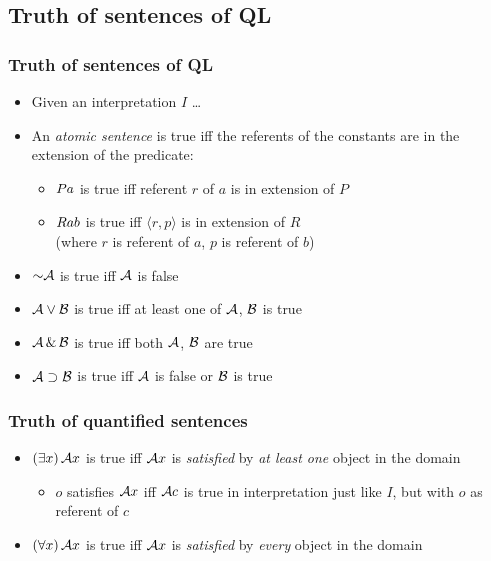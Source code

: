 \subsection{Truth of sentences of QL}

\begin{frame}
  \frametitle{Truth of sentences of QL}

  \begin{itemize}[<+->]
    \item Given an interpretation $I$ \dots
    \item An \emph{atomic sentence} is true iff the referents of the constants are in the extension of the predicate:
    \begin{itemize}
    \item $Pa$ is true iff referent $r$ of $a$ is in extension of $P$
    \item $Rab$ is true iff $\langle r,p\rangle$ is in extension of $R$\\
    (where $r$ is referent of $a$, $p$ is referent of $b$)
    \end{itemize}
    \item $\enot\metav{A}$ is true iff $\mathcal{A}$ is false
    \item $\mathcal{A} \vee \mathcal{B}$ is true iff at least one of $\mathcal{A}$, $\mathcal{B}$ is true
    \item $\mathcal{A} \,\&\, \mathcal{B}$ is true iff both $\mathcal{A}$, $\mathcal{B}$ are true
    \item $\mathcal{A} \supset \mathcal{B}$ is true iff $\mathcal{A}$ is false or $\mathcal{B}$ is true
  \end{itemize}
\end{frame}

\begin{frame}
  \frametitle{Truth of quantified sentences}

  \begin{itemize}[<+->]
    \item $(\exists x)\,\mathcal{A}x$ is true iff $\mathcal{A}x$ is \emph{satisfied} by \emph{at least one} object in the domain
    \begin{itemize}
      \item $o$ satisfies $\mathcal{A}x$ iff $\mathcal{A}c$ is true in interpretation just like $I$, but with $o$ as referent of $c$
    \end{itemize}
    \item $(\forall x)\,\mathcal{A}x$ is true iff $\mathcal{A}x$ is \emph{satisfied} by \emph{every} object in the domain
  \end{itemize}
\end{frame}


